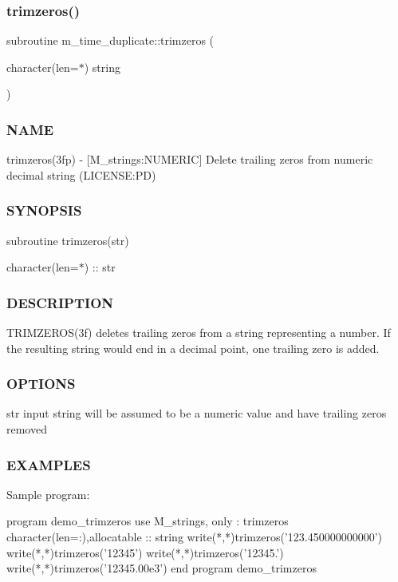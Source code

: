 \subsubsection{\texorpdfstring{trimzeros()}{trimzeros()}}
{\footnotesize\ttfamily subroutine m\+\_\+time\+\_\+duplicate\+::trimzeros (\begin{DoxyParamCaption}\item[{character(len=$\ast$)}]{string }\end{DoxyParamCaption})}



\subsubsection*{N\+A\+ME}

trimzeros(3fp) -\/ \mbox{[}M\+\_\+strings\+:N\+U\+M\+E\+R\+IC\mbox{]} Delete trailing zeros from numeric decimal string (L\+I\+C\+E\+N\+SE\+:PD) \subsubsection*{S\+Y\+N\+O\+P\+S\+IS}

subroutine trimzeros(str)

character(len=$\ast$) \+:\+: str \subsubsection*{D\+E\+S\+C\+R\+I\+P\+T\+I\+ON}

T\+R\+I\+M\+Z\+E\+R\+O\+S(3f) deletes trailing zeros from a string representing a number. If the resulting string would end in a decimal point, one trailing zero is added. \subsubsection*{O\+P\+T\+I\+O\+NS}

str input string will be assumed to be a numeric value and have trailing zeros removed \subsubsection*{E\+X\+A\+M\+P\+L\+ES}

\begin{DoxyVerb}Sample program:

   program demo_trimzeros
   use M_strings, only : trimzeros
   character(len=:),allocatable :: string
      write(*,*)trimzeros('123.450000000000')
      write(*,*)trimzeros('12345')
      write(*,*)trimzeros('12345.')
      write(*,*)trimzeros('12345.00e3')
   end program demo_trimzeros
\end{DoxyVerb}


